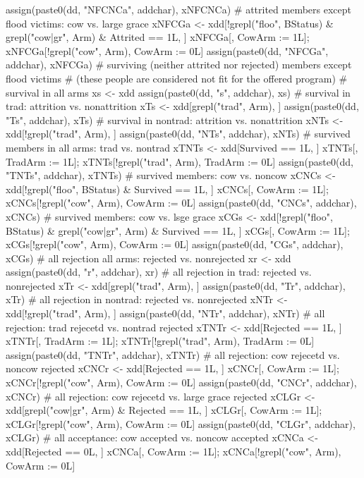 \begin{Schunk}
\begin{Sinput}
{{    assign(paste0(dd, "NFCNCa", addchar), xNFCNCa)
    # attrited members except flood victims: cow vs. large grace
    xNFCGa <- xdd[!grepl("floo", BStatus) & grepl("cow|gr", Arm) & Attrited == 1L, ]
    xNFCGa[, CowArm := 1L]; xNFCGa[!grepl("cow", Arm), CowArm := 0L]
    assign(paste0(dd, "NFCGa", addchar), xNFCGa)
    # surviving (neither attrited nor rejected) members except flood victims 
    # (these people are considered not fit for the offered program)
    # survival in all arms
    xs <- xdd
    assign(paste0(dd, "s", addchar), xs)
    # survival in trad: attrition vs. nonattrition
    xTs <- xdd[grepl("trad", Arm), ]
    assign(paste0(dd, "Ts", addchar), xTs)
    # survival in nontrad: attrition vs. nonattrition
    xNTs <- xdd[!grepl("trad", Arm), ]
    assign(paste0(dd, "NTs", addchar), xNTs)
    # survived members in all arms: trad vs. nontrad
    xTNTs <- xdd[Survived == 1L, ]
    xTNTs[, TradArm := 1L]; xTNTs[!grepl("trad", Arm), TradArm := 0L]
    assign(paste0(dd, "TNTs", addchar), xTNTs)
    # survived members: cow vs. noncow
    xCNCs <- xdd[!grepl("floo", BStatus) & Survived == 1L, ]
    xCNCs[, CowArm := 1L]; xCNCs[!grepl("cow", Arm), CowArm := 0L]
    assign(paste0(dd, "CNCs", addchar), xCNCs)
    # survived members: cow vs. lsge grace
    xCGs <- xdd[!grepl("floo", BStatus) & grepl("cow|gr", Arm) & Survived == 1L, ]
    xCGs[, CowArm := 1L]; xCGs[!grepl("cow", Arm), CowArm := 0L]
    assign(paste0(dd, "CGs", addchar), xCGs)
    # all rejection all arms: rejected vs. nonrejected
    xr <- xdd
    assign(paste0(dd, "r", addchar), xr)
    # all rejection in trad: rejected vs. nonrejected
    xTr <- xdd[grepl("trad", Arm), ]
    assign(paste0(dd, "Tr", addchar), xTr)
    # all rejection in nontrad: rejected vs. nonrejected
    xNTr <- xdd[!grepl("trad", Arm), ]
    assign(paste0(dd, "NTr", addchar), xNTr)
    # all rejection: trad rejecetd vs. nontrad rejected
    xTNTr <- xdd[Rejected == 1L, ]
    xTNTr[, TradArm := 1L]; xTNTr[!grepl("trad", Arm), TradArm := 0L]
    assign(paste0(dd, "TNTr", addchar), xTNTr)
    # all rejection: cow rejecetd vs. noncow rejected
    xCNCr <- xdd[Rejected == 1L, ]
    xCNCr[, CowArm := 1L]; xCNCr[!grepl("cow", Arm), CowArm := 0L]
    assign(paste0(dd, "CNCr", addchar), xCNCr)
    # all rejection: cow rejecetd vs. large grace rejected
    xCLGr <- xdd[grepl("cow|gr", Arm) & Rejected == 1L, ]
    xCLGr[, CowArm := 1L]; xCLGr[!grepl("cow", Arm), CowArm := 0L]
    assign(paste0(dd, "CLGr", addchar), xCLGr)
    # all acceptance: cow accepted vs. noncow accepted
    xCNCa <- xdd[Rejected == 0L, ]
    xCNCa[, CowArm := 1L]; xCNCa[!grepl("cow", Arm), CowArm := 0L]
}}
\end{Sinput}
\end{Schunk}
